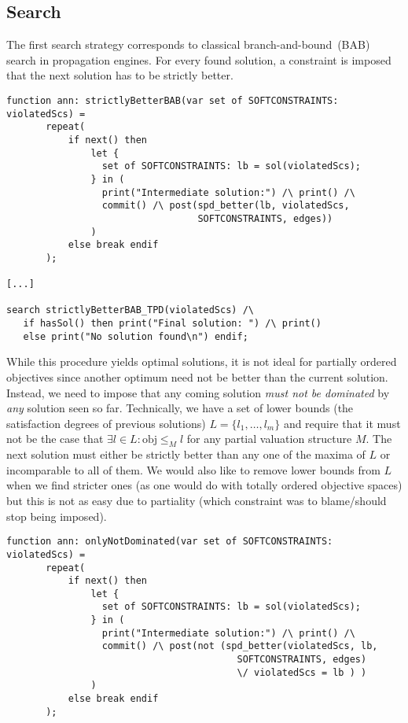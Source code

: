 \subsection{Search}

The first search strategy corresponds to classical branch-and-bound~(BAB) search
in propagation engines. For every found solution, a constraint is imposed that 
the next solution has to be strictly better.

\begin{lstlisting}
function ann: strictlyBetterBAB(var set of SOFTCONSTRAINTS: violatedScs) =
       repeat(
           if next() then
               let {
                 set of SOFTCONSTRAINTS: lb = sol(violatedScs); 
               } in (
                 print("Intermediate solution:") /\ print() /\
                 commit() /\ post(spd_better(lb, violatedScs, 
                                  SOFTCONSTRAINTS, edges))
               )
           else break endif
       );
       
[...]
       
search strictlyBetterBAB_TPD(violatedScs) /\ 
   if hasSol() then print("Final solution: ") /\ print() 
   else print("No solution found\n") endif;
\end{lstlisting}

While this procedure yields optimal solutions, it is not ideal for partially ordered objectives since 
another optimum need not be better than the current solution. Instead, we need to impose that any coming 
solution \emph{must not be dominated} by \emph{any} solution seen so far. Technically,
we have a set of lower bounds (the satisfaction degrees of previous solutions) $L = \{l_1, \ldots, l_m \}$ and
require that it must not be the case that $\exists l \in L : \mathrm{obj} \leq_M l$ for any partial valuation
structure $M$. The next solution must either be strictly better than any one of the maxima of $L$ or incomparable to
all of them. We would also like to remove lower bounds from $L$ when we find stricter ones (as one would do with
totally ordered objective spaces) but this is not as easy due to partiality (which constraint was to blame/should
stop being imposed).

\begin{lstlisting}
function ann: onlyNotDominated(var set of SOFTCONSTRAINTS: violatedScs) =
       repeat(
           if next() then
               let {
                 set of SOFTCONSTRAINTS: lb = sol(violatedScs); 
               } in (
                 print("Intermediate solution:") /\ print() /\
                 commit() /\ post(not (spd_better(violatedScs, lb, 
                                         SOFTCONSTRAINTS, edges) 
                                         \/ violatedScs = lb ) )
               )
           else break endif
       );
\end{lstlisting}

